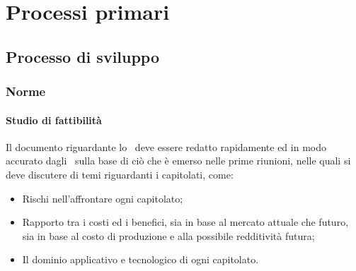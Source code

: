 \documentclass[../NormeProgetto.tex]{subfiles}
\begin{document}
\section{Processi primari}
	\subsection{Processo di sviluppo}
		\subsubsection{Norme}
			\paragraph{Studio di fattibilità}
			Il documento riguardante lo \studiodifattibilita\ deve essere redatto rapidamente ed in modo accurato dagli \analisti\ sulla base di ciò che è emerso nelle prime riunioni, nelle quali si deve discutere di temi riguardanti i capitolati, come:
			\begin{itemize}
				\item Rischi nell'affrontare ogni capitolato;
				\item Rapporto tra i costi ed i benefici, sia in base al mercato attuale che futuro, sia in base al costo di produzione e alla possibile redditività futura;
				\item Il dominio applicativo e tecnologico di ogni capitolato.
			\end{itemize}
\end{document}
